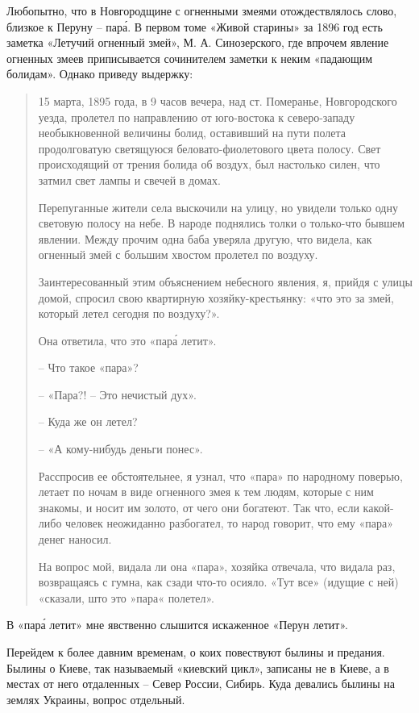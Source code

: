 Любопытно, что в Новгородщине с огненными змеями отождествлялось слово, близкое к Перуну – пар\'а. В первом томе «Живой старины» за 1896 год  есть заметка «Летучий огненный змей», М. А. Синозерского, где впрочем явление огненных змеев приписывается сочинителем заметки к неким «падающим болидам». Однако приведу выдержку:

\begin{quotation}
15 марта, 1895 года, в 9 часов вечера, над ст. Померанье, Новгородского уезда, пролетел по направлению от юго-востока к северо-западу необыкновенной величины болид, оставивший на пути полета продолговатую светящуюся беловато-фиолетового цвета полосу. Свет происходящий от трения болида об воздух, был настолько силен, что затмил свет лампы и свечей в домах.

Перепуганные жители села выскочили на улицу, но увидели только одну световую полосу на небе. В народе поднялись толки о только-что бывшем явлении. Между прочим одна баба уверяла другую, что видела, как огненный змей с большим хвостом пролетел по воздуху.

Заинтересованный этим объяснением небесного явления, я, прийдя с улицы домой, спросил свою квартирную хозяйку-крестьянку: «что это за змей, который летел сегодня по воздуху?».

Она ответила, что это «пар\'а летит».

 – Что такое «пара»?

 – «Пара?! – Это нечистый дух».

 – Куда же он летел?

 – «А кому-нибудь деньги понес».

   Расспросив ее обстоятельнее, я узнал, что «пара» по народному поверью, летает по ночам в виде огненного змея к тем людям, которые с ним знакомы, и носит им золото, от чего они богатеют. Так что, если какой-либо человек неожиданно разбогател, то народ говорит, что ему «пара» денег наносил.

На вопрос мой, видала ли она «пара», хозяйка отвечала, что видала раз, возвращаясь с гумна, как сзади что-то осияло. «Тут все» (идущие с ней) «сказали, што это »пара« полетел».
\end{quotation}
 
В «пар\'а летит» мне явственно слышится искаженное «Перун летит».
 
Перейдем к более давним временам, о коих повествуют былины и предания. Былины о Киеве, так называемый «киевский цикл», записаны не в Киеве, а в местах от него отдаленных – Север России, Сибирь. Куда девались былины на землях Украины, вопрос отдельный.
